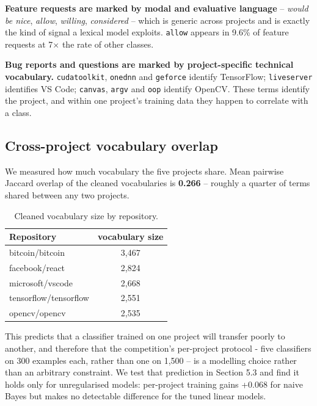 \textbf{Feature requests are marked by modal and evaluative language} -- \textit{would be nice}, \textit{allow}, \textit{willing}, \textit{considered} -- which is generic across projects and is exactly the kind of signal a lexical model exploits. \texttt{allow} appears in 9.6\% of feature requests at 7$\times$ the rate of other classes.

\textbf{Bug reports and questions are marked by project-specific technical vocabulary.} \texttt{cudatoolkit}, \texttt{onednn} and \texttt{geforce} identify TensorFlow; \texttt{liveserver} identifies VS Code; \texttt{canvas}, \texttt{argv} and \texttt{oop} identify OpenCV. These terms identify the project, and within one project's training data they happen to correlate with a class.

\subsection{Cross-project vocabulary overlap}

We measured how much vocabulary the five projects share. Mean pairwise Jaccard overlap of the cleaned vocabularies is \textbf{0.266} -- roughly a quarter of terms shared between any two projects.

\begin{table}[h]
\centering
\caption{Cleaned vocabulary size by repository.}
\label{tab:repo_vocab_size}
\vspace{0.5em}
\begin{tabular}{l c}
\hline
Repository & vocabulary size \\
\hline
bitcoin/bitcoin & 3,467 \\
facebook/react & 2,824 \\
microsoft/vscode & 2,668 \\
tensorflow/tensorflow & 2,551 \\
opencv/opencv & 2,535 \\
\hline
\end{tabular}
\end{table}

This predicts that a classifier trained on one project will transfer poorly to another, and therefore that the competition's per-project protocol - five classifiers on 300 examples each, rather than one on 1,500 -- is a modelling choice rather than an arbitrary constraint. We test that prediction in Section 5.3 and find it holds only for unregularised models: per-project training gains +0.068 for naive Bayes but makes no detectable difference for the tuned linear models.


